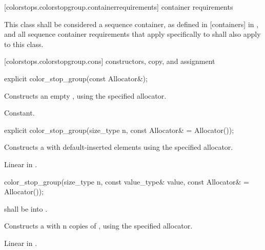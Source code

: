  [colorstops.colorstopgroup.containerrequirements] { container requirements}

\pnum
This class shall be considered a sequence container, as defined in [containers] in \cppseventeen, and all sequence container requirements that apply specifically to  shall also apply to this class.

 [colorstops.colorstopgroup.cons] { constructors, copy, and assignment}

\begin{itemdecl}
	explicit color_stop_group(const Allocator&);
\end{itemdecl}
\begin{itemdescr}
	\pnum
	\effects
	Constructs an empty , using the specified allocator.
	
	\pnum
	\complexity
	Constant.
\end{itemdescr}

\begin{itemdecl}
	explicit color_stop_group(size_type n, const Allocator& = Allocator());
\end{itemdecl}
\begin{itemdescr}
	\pnum
	\effects
	Constructs a  with  default-inserted elements using the specified allocator.
	
	\pnum
	\complexity
	Linear in .
\end{itemdescr}

\begin{itemdecl}
	color_stop_group(size_type n, const value_type& value,
	  const Allocator& = Allocator());
\end{itemdecl}
\begin{itemdescr}
	\pnum
	\requires
	 shall be  into .
	
	\pnum
	\effects
	Constructs a  with n copies of , using the specified allocator.
	
	\pnum
	\complexity
	Linear in .
\end{itemdescr}

